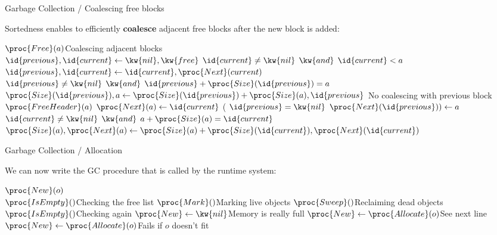 \documentclass[compress,dvipdfmx]{beamer}
\begin{document}
%
\begin{frame}{Garbage Collection / Coalescing free blocks}

  Sortedness enables to efficiently \textbf{coalesce} adjacent free
  blocks after the new block is added:
  \begin{codebox}
    \(\proc{Free}(a)\)\RComment Coalescing adjacent blocks\\
    \li \(\id{previous}, \id{current} \gets \kw{nil}, \kw{free}\)
    \li \While \(\id{current} \neq \kw{nil} \,\; \kw{and} \,\;
                 \id{current} < a\) 
    \li \> \(\id{previous}, \id{current}
            \gets \id{current}, \proc{Next}(current)\)
    \li {} \(\id{previous} \neq \kw{nil} \,\; \kw{and} \,\;
                  \id{previous} + \proc{Size}(\id{previous}) = a\) 
    \li \> \(\proc{Size}(\id{previous}), a \gets
             \proc{Size}(\id{previous}) + \proc{Size}(a), \id{previous}\)
    \li {}\RComment No coalescing with previous block
    \li \> \(\proc{FreeHeader}(a)\)
    \li \> \(\proc{Next}(a) \gets \id{current}\)
    \li \> ( \(\id{previous} = \kw{nil}\)  
      \(\proc{Next}(\id{previous})) \gets a\)
    \li {} \(\id{current} \neq \kw{nil} \,\; \kw{and} \,\;
                  a + \proc{Size}(a) = \id{current}\) 
    \li \> \(\proc{Size}(a), \proc{Next}(a) \gets
             \proc{Size}(a) + \proc{Size}(\id{current}), \proc{Next}(\id{current})\)
  \end{codebox}

\end{frame}

%
\begin{frame}{Garbage Collection / Allocation}

  We can now write the GC procedure  that is called by the
  runtime system:
  \begin{codebox}
    \(\proc{New}(o)\)\\
    \li \If \(\proc{IsEmpty}()\)\RComment Checking the free list
    \li \Then \(\proc{Mark}()\)\RComment Marking live objects
    \li       \(\proc{Sweep}()\)\RComment Reclaiming dead objects
    \li       \If \(\proc{IsEmpty}()\)\RComment Checking again
    \li       \Then \(\proc{New} \gets \kw{nil}\)\RComment Memory is
    really full
    \li       \Else \(\proc{New} \gets \proc{Allocate}(o)\)\RComment See next line
              \End
    \li  \Else \(\proc{New} \gets \proc{Allocate}(o)\)\RComment Fails if \(o\)
    doesn't fit
         \End
  \end{codebox}

\end{frame}
\end{document}
